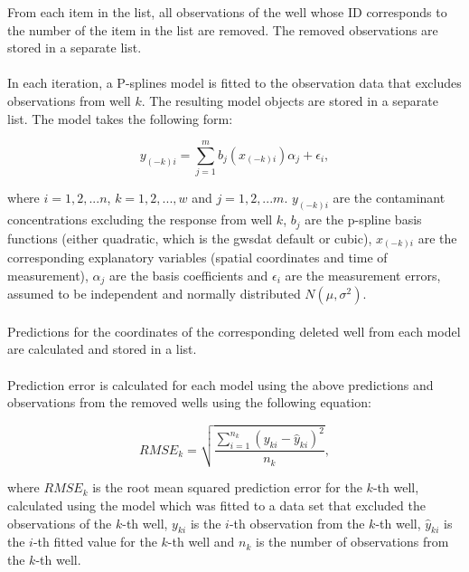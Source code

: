 \documentclass{article}
\begin{document}
From each item in the list, all observations of the well whose ID corresponds to the number of the item in the list are removed. The removed observations are stored in a separate list.

\paragraph{}

In each iteration, a P-splines model \parencite[]{gwsdat} is fitted to the observation data that excludes observations from well $k$. The resulting model objects are stored in a separate list. The model takes the following form:

\begin{equation}
\label{eqn:model}
    y_{(-k)i} = \sum_{j=1}^{m}{b_j(x_{(-k)i})\alpha_j + \epsilon_i},
\end{equation}

where $i = 1, 2, ... n$, $k=1,2,...,w$ and $j = 1, 2, ... m$. $y_{(-k)i}$ are the contaminant concentrations excluding the response from well $k$, $b_j$ are the p-spline basis functions (either quadratic, which is the gwsdat default or cubic), $x_{(-k)i}$ are the corresponding explanatory variables (spatial coordinates and time of measurement), $\alpha_j$ are the basis coefficients and $\epsilon_i$ are the measurement errors, assumed to be independent and normally distributed $N(\mu,\sigma^2)$.

\paragraph{}

Predictions for the coordinates of the corresponding deleted well from each model are calculated and stored in a list.

\paragraph{}

Prediction error is calculated for each model using the above predictions and observations from the removed wells using the following equation:

\begin{equation}
    RMSE_k = \sqrt{\frac{\sum_{i=1}^{n_k}{(y_{ki} - \hat{y}_{ki})^2}}{n_k}},
\end{equation}

where $RMSE_k$ is the root mean squared prediction error for the $k$-th well, calculated using the model which was fitted to a data set that excluded the observations of the $k$-th well, $y_{ki}$ is the $i$-th observation from the $k$-th well, $\hat{y}_{ki}$ is the $i$-th fitted value for the $k$-th well and $n_k$ is the number of observations from the $k$-th well.
\end{document}
